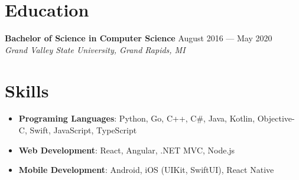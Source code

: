 \documentclass{article}
\begin{document}
\section*{Education}
\textbf{Bachelor of Science in Computer Science} \hfill August 2016 --- May 2020\\
\textit{Grand Valley State University, Grand Rapids, MI}

\section*{Skills}
\begin{itemize}
\item \textbf{Programing Languages}: Python, Go, C++, C\#, Java, Kotlin, Objective-C, Swift, JavaScript, TypeScript
\item \textbf{Web Development}: React, Angular, .NET MVC, Node.js
\item \textbf{Mobile Development}: Android, iOS (UIKit, SwiftUI), React Native
\end{itemize}
\end{document}
